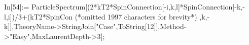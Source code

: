 In[54]:= ParticleSpectrum[(2*kT2*SpinConnection[-i,k,l]*SpinConnection[-k,-l,i])/3+(kT2*SpinCon (*omitted 1997 characters for brevity*) ,k,-k]],TheoryName->StringJoin["Case",ToString[12]],Method->"Easy",MaxLaurentDepth->3];